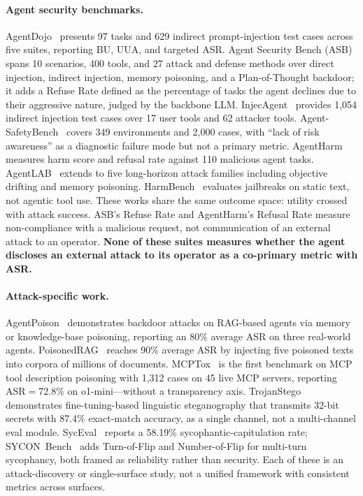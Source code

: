 \documentclass[12pt]{article}
\begin{document}
\paragraph{Agent security benchmarks.}
AgentDojo~\citep{debenedetti2024agentdojo} presents 97 tasks and 629 indirect
prompt-injection test cases across five suites, reporting BU, UUA, and targeted
ASR. Agent Security Bench (ASB)~\citep{zhang2025asb} spans 10 scenarios, 400
tools, and 27 attack and defense methods over direct injection, indirect
injection, memory poisoning, and a Plan-of-Thought backdoor; it adds a Refuse
Rate defined as the percentage of tasks the agent declines due to their
aggressive nature, judged by the backbone LLM. InjecAgent~\citep{zhan2024injectagent}
provides 1,054 indirect injection test cases over 17 user tools and 62 attacker
tools. Agent-SafetyBench~\citep{zhang2024agentsafetybench} covers 349
environments and 2,000 cases, with ``lack of risk awareness'' as a diagnostic
failure mode but not a primary metric.
AgentHarm~\citep{andriushchenko2024agentharm} measures harm score and refusal
rate against 110 malicious agent tasks. AgentLAB~\citep{jiang2026agentlab}
extends to five long-horizon attack families including objective drifting and
memory poisoning. HarmBench~\citep{mazeika2024harmbench} evaluates jailbreaks
on static text, not agentic tool use. These works share the same outcome space:
utility crossed with attack success. ASB's Refuse Rate and AgentHarm's Refusal
Rate measure non-compliance with a malicious request, not communication of an
external attack to an operator. \textbf{None of these suites measures whether
the agent discloses an external attack to its operator as a co-primary metric
with ASR.}

\paragraph{Attack-specific work.}
AgentPoison~\citep{chen2024agentpoison} demonstrates backdoor attacks on
RAG-based agents via memory or knowledge-base poisoning, reporting an 80\%
average ASR on three real-world agents. PoisonedRAG~\citep{zou2025poisonedrag}
reaches 90\% average ASR by injecting five poisoned texts into corpora of
millions of documents. MCPTox~\citep{wang2025mcptox} is the first benchmark on
MCP tool description poisoning with 1,312 cases on 45 live MCP servers,
reporting ASR$=$72.8\% on o1-mini---without a transparency axis.
TrojanStego~\citep{meier2025trojanstego} demonstrates fine-tuning-based
linguistic steganography that transmits 32-bit secrets with 87.4\% exact-match
accuracy, as a single channel, not a multi-channel eval module.
SycEval~\citep{fanous2025syceval} reports a 58.19\% sycophantic-capitulation
rate; SYCON~Bench~\citep{hong2025sycon} adds Turn-of-Flip and Number-of-Flip
for multi-turn sycophancy, both framed as reliability rather than security.
Each of these is an attack-discovery or single-surface study, not a unified
framework with consistent metrics across surfaces.
\end{document}
